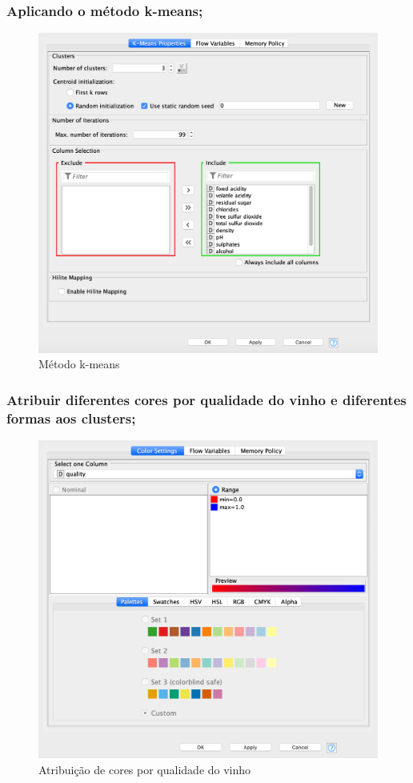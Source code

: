 \documentclass{article}
\begin{document}
\subsubsection{Aplicando o método k-means;}

\begin{figure}[H]
    \centering
    \includegraphics[scale=0.3]{Images/T4_a.png}
    \caption{Método k-means}
\end{figure}

\subsubsection{Atribuir diferentes cores por qualidade do vinho e diferentes formas aos clusters;}

\begin{figure}[H]
    \centering
    \includegraphics[scale=0.2]{Images/T4_b1.png}
    \caption{Atribuição de cores por qualidade do vinho}
\end{figure}
\end{document}
